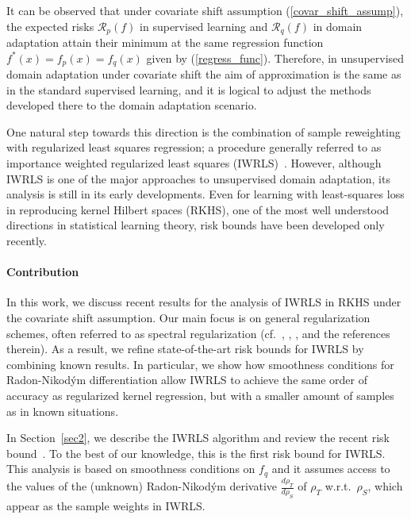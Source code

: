 \documentclass[USenglish]{article}
\begin{document}
It can be observed that under covariate shift assumption (\ref{covar_shift_assump}), the expected risks $\mathcal{R}_p (f)$ in supervised learning and $\mathcal{R}_q (f)$ in domain adaptation attain their minimum at the same regression function $f^* (x) = f_p (x) = f_q(x)$ given by (\ref{regress_func}).
Therefore, in unsupervised domain adaptation under covariate shift the aim of approximation is the same as in the standard supervised learning, and it is logical to adjust the methods developed there to the domain adaptation scenario.

One natural step towards this direction is the combination of sample reweighting with regularized least squares regression; a procedure generally referred to as importance weighted regularized least squares (IWRLS)~\cite{shimodaira2000, sugiyama2005, kanamori2009}.
However, although IWRLS is one of the major approaches to unsupervised domain adaptation, its analysis is still in its early developments.
Even for learning with least-squares loss in reproducing kernel Hilbert spaces (RKHS), one of the most well understood directions in statistical learning theory, risk bounds have been developed only recently.

\paragraph*{Contribution}
In this work, we discuss recent results for the analysis of IWRLS in RKHS under the covariate shift assumption.
Our main focus is on general regularization schemes, often referred to as spectral regularization (cf.~\cite{bauer2007}, \cite{rosasco2008}, \cite{lu2018}, and the references therein).
As a result, we refine state-of-the-art risk bounds for IWRLS by combining known results.
In particular, we show how smoothness conditions for Radon-Nikod\'ym differentiation allow IWRLS to achieve the same order of accuracy as regularized kernel regression, but with a smaller amount of samples as in known situations.

In Section~\ref{sec2}, we describe the IWRLS algorithm and review the recent risk bound~\cite{gizewski2022regularization}.
To the best of our knowledge, this is the first risk bound for IWRLS.
This analysis is based on smoothness conditions on $f_q$ and it assumes access to the values of the (unknown) Radon-Nikod\'ym derivative $\frac{d \rho_T}{d \rho_S}$ of $\rho_T$ w.r.t.~$\rho_S$, which appear as the sample weights in IWRLS.
\end{document}
